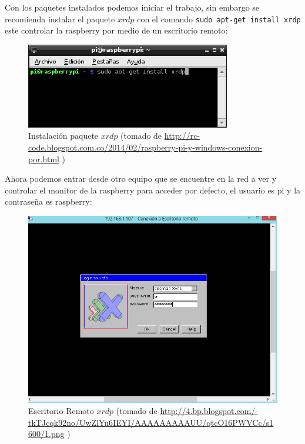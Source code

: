 \documentclass[10pt]{article}\usepackage[]{graphicx}\usepackage[]{color}
\begin{document}
Con los paquetes instalados podemos iniciar el trabajo, sin embargo se recomienda instalar el paquete $xrdp$  con el comando \texttt{sudo apt-get install xrdp} este controlar la raspberry por medio de un escritorio remoto:	

	\begin{figure}[H] %
		\centering
		\includegraphics[scale=0.8]{xrdp}   %
		\caption{Instalación paquete $xrdp$ (tomado de \href{http://rc-code.blogspot.com.co/2014/02/raspberry-pi-y-windows-conexion-por.html}{http://rc-code.blogspot.com.co/2014/02/raspberry-pi-y-windows-conexion-por.html} )}
		
	\end{figure}
	
Ahora podemos entrar desde otro equipo que se encuentre en la red a ver y controlar el monitor de la raspberry para acceder por defecto, el usuario es pi y la contraseña es raspberry:	



	\begin{figure}[ht] %
		\centering
		\includegraphics[scale=0.5]{remoto}   %
		\caption{Escritorio Remoto $xrdp$ (tomado de \href{http://4.bp.blogspot.com/-tkTJcqk92no/UwZlYu6IEYI/AAAAAAAAAUU/qtcO16PWVCc/s1600/1.png}{http://4.bp.blogspot.com/-tkTJcqk92no/UwZlYu6IEYI/AAAAAAAAAUU/qtcO16PWVCc/s1600/1.png} )}	
	\end{figure}
	
\end{document}
